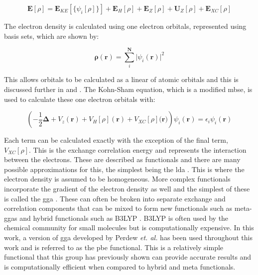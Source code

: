 \begin{equation}
\boldsymbol{E}[\rho] = \boldsymbol{E}_{KE}[\{\psi_i[\rho]\}] + \boldsymbol{E}_{H}[\rho] + \boldsymbol{E}_{Z}[\rho] + \boldsymbol{U}_{Z}[\rho] + \boldsymbol{E}_{XC}[\rho]
\end{equation}

The electron density is calculated using one electron orbitals, represented using basis sets, which are shown by:

\begin{equation}
\boldsymbol{\rho}(\mathbf{r}) = \sum_{i}^{\boldsymbol{N}} \lvert {\psi_i(\mathbf{r})} \rvert ^2
\end{equation}

This allows orbitals to be calculated as a linear \DIFdelbegin {}\DIFdelend \DIFaddbegin {}\DIFaddend of atomic orbitals and this is discussed further in  and . The Kohn\nobreakdash-Sham equation, which is a modified \acrshort{mbse}, is used to calculate these one electron orbitals with:

\begin{equation}
\left( -\frac{1}{2}\boldsymbol{\Delta} + V_z(\mathbf{r}) + V_H[\rho](\mathbf{r}) + V_{XC}[\rho](\mathbf{r)}\right) \psi_i(\mathbf{r}) =  \epsilon_i \psi_i (\mathbf{r})
\end{equation}

Each term can be calculated exactly with the exception of the final term, \(V_{XC}[\rho]\). This is the exchange correlation energy and represents the interaction between the electrons. These are described as functionals and there are many possible approximations for this, the simplest being the \acrfull{lda} \DIFdelbegin \DIFdel{~}\DIFdelend \cite{Sahni1988}. This is where the electron density is assumed to be homogeneous. More complex functionals incorporate the gradient of the electron density as well and the simplest of these is called the \acrfull{gga} \DIFdelbegin \DIFdel{~}\DIFdelend \cite{Perdew1996}. These can often be broken into separate exchange and correlation components that can be mixed to form new functionals such as meta\nobreakdash-\acrshort{gga}s \DIFdelbegin \DIFdel{~}\DIFdelend \cite{Furness2021} and hybrid functionals such as B3LYP \DIFdelbegin \DIFdel{~}\DIFdelend \cite{Stephens1994}. B3LYP is often used by the chemical community for small molecules but is computationally expensive. In this work, a version of \acrshort{gga} developed by Perdew \textit{et. al.} \DIFdelbegin \DIFdel{~}\DIFdelend \cite{Perdew1996_2} has been used throughout this work and is referred to as the \acrfull{pbe} functional. This is a relatively simple functional that this group has previously shown can provide accurate results and is computationally efficient when compared to hybrid and meta functionals.

